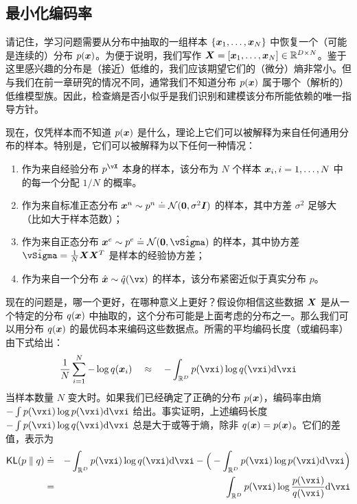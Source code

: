 \documentclass[../../book-main_zh.tex]{subfiles}
\begin{document}
\subsection{最小化编码率}\label{sub:min_entropy}
请记住，学习问题需要从分布中抽取的一组样本 $\{\bm{x}_1, \ldots, \bm{x}_N\}$ 中恢复一个（可能是连续的）分布 $p(\bm{x})$。为便于说明，我们写作 $\bm{X} = [\bm{x}_1, \ldots, \bm{x}_N] \in \mathbb{R}^{D\times N}$。鉴于这里感兴趣的分布是（接近）低维的，我们应该期望它们的（微分）熵非常小。但与我们在前一章研究的情况不同，通常我们不知道分布 $p(\bm{x})$ 属于哪个（解析的）低维模型族。因此，检查熵是否小似乎是我们识别和建模该分布所能依赖的唯一指导方针。

现在，仅凭样本而不知道 $p(\bm{x})$ 是什么，理论上它们可以被解释为来自任何通用分布的样本。特别是，它们可以被解释为以下任何一种情况：
\begin{enumerate}
	\item 作为来自经验分布 $p^{\vX}$ 本身的样本，该分布为 $N$ 个样本 $\bm{x}_i, i=1, \ldots, N$ 中的每一个分配 $1/N$ 的概率。
	\item 作为来自标准正态分布 $\bm{x}^n \sim p^{n} \doteq \mathcal{N}(\boldsymbol{0}, \sigma^2 \boldsymbol{I})$ 的样本，其中方差 $\sigma^2$ 足够大（比如大于样本范数）；
	\item 作为来自正态分布 $\x^e \sim p^{e} \doteq \mathcal{N}(\boldsymbol{0}, \hat{\vSigma})$ 的样本，其中协方差 $\hat{\vSigma} = \frac{1}{N} \X \X^T$ 是样本的经验协方差；
	\item 作为来自一个分布 $\hat \x \sim \hat{q}(\vx)$ 的样本，该分布紧密近似于真实分布 $p$。
\end{enumerate}
现在的问题是，哪一个更好，在哪种意义上更好？假设你相信这些数据 $\bm{X}$ 是从一个特定的分布 $q(\bm{x})$ 中抽取的，这个分布可能是上面考虑的分布之一。那么我们可以用分布 $q(\bm{x})$ 的最优码本来编码这些数据点。所需的平均编码长度（或编码率）由下式给出：
\begin{equation}
	\frac{1}{N}\sum_{i=1}^N -\log q(\x_i) \quad \approx \quad - \int_{\R^{D}} p(\vxi) \log q(\vxi)\odif{\vxi}
\end{equation}
当样本数量 $N$ 变大时。如果我们已经确定了正确的分布 $p(\bm{x})$，编码率由熵 $- \int p(\vxi) \log p(\vxi) \odif{\vxi}$ 给出。事实证明，上述编码长度 $- \int p(\vxi) \log q(\vxi) \odif{\vxi}$ 总是大于或等于熵，除非 $q(\bm{x}) = p(\bm{x})$。它们的差值，表示为
\begin{eqnarray}
	\KL(p \mmid q) &\doteq& - \int_{\R^{D}} p(\vxi) \log q(\vxi) \odif{\vxi}  - \Big(- \int_{\R^{D}} p(\vxi) \log p(\vxi) \odif{\vxi} \Big)\\
	&=& \int_{\R^{D}} p(\vxi) \log \frac{p(\vxi)}{q(\vxi)} \odif{\vxi}
\end{eqnarray}
\end{document}

